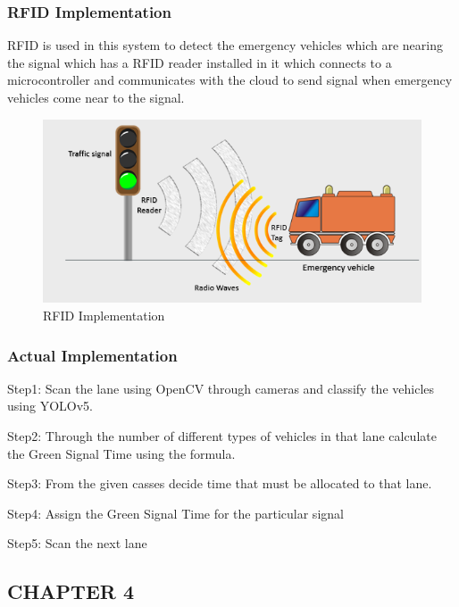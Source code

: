 \documentclass[12pt,a4paper]{report}
\begin{document}
\subsection{ RFID Implementation}
RFID is used in this system to detect the emergency vehicles which are nearing the signal which has a RFID reader installed in it which connects to a microcontroller and communicates with the cloud to send signal when emergency vehicles come near to the signal.
\par      

    
   \begin{figure}[h]
			\centering
			\includegraphics[width=150mm]{impkrfid.png}
			\caption{RFID Implementation}
			\label{fig_23}
		\end{figure}
\newpage   
\subsection{Actual Implementation}
Step1: Scan the lane using OpenCV through cameras and classify the vehicles using YOLOv5.\par
Step2: Through the number of different types of vehicles in that lane calculate the Green Signal Time using the formula.\par
Step3: From the given casses decide time that must be allocated to that lane. \par
Step4: Assign the Green Signal Time for the particular signal\par
Step5: Scan the next lane\par    



\begin{center}
	\chapter{\textbf{\Large{CHAPTER 4}}}
\end{center}
  
\end{document}
